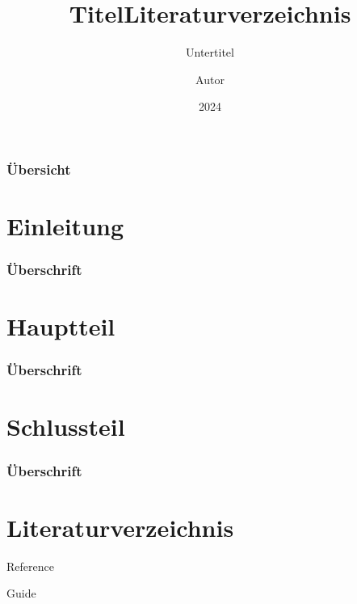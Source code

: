 \documentclass[ngerman]{beamer}
\title{Titel}
\subtitle{Untertitel}
\author{Autor}
\institute[GGS]{Schule}
\date{2024}
\begin{document}
\frame{\titlepage}

\begin{frame}
    \frametitle{Übersicht}

    \tableofcontents

\end{frame}

\section{Einleitung}

\begin{frame}
\frametitle{Überschrift}
\blindtext

\end{frame}

\section{Hauptteil}

\begin{frame}
\frametitle{Überschrift}
\blindtext

\end{frame}

\section{Schlussteil}

\begin{frame}
\frametitle{Überschrift}
\blindtext

\end{frame}

\section{Literaturverzeichnis}

\begin{frame}

\title{Literaturverzeichnis}

\begin{thebibliography}{2}
    Reference
    
    Guide
\end{thebibliography}

\end{frame}
\end{document}
